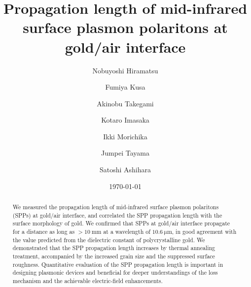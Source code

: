 \documentclass[aip,apl,reprint]{revtex4-1}
\begin{document}
\title{Propagation length of mid-infrared surface plasmon polaritons at gold/air interface}
\author{Nobuyoshi Hiramatsu}
\author{Fumiya Kusa}
\author{Akinobu Takegami}
\author{Kotaro Imasaka}
\author{Ikki Morichika}
\author{Jumpei Tayama}
\author{Satoshi Ashihara}

\date{\today}

\begin{abstract}
We measured the propagation length of mid-infrared surface plasmon polaritons (SPPs) at gold/air interface, and correlated the SPP propagation length with the surface morphology of gold. We confirmed that SPPs at gold/air interface propagate for a distance as long as $>10\:\mathrm{mm}$ at a wavelength of $10.6\:\mathrm{\mu m}$, in good agreement with the value predicted from the dielectric constant of polycrystalline gold. We demonstrated that the SPP propagation length increases by thermal annealing treatment, accompanied by the increased grain size and the suppressed surface roughness. Quantitative evaluation of the SPP propagation length is important in designing plasmonic devices and beneficial for deeper understandings of the loss mechanism and the achievable electric-field enhancements.
\end{abstract}

\maketitle
 
\end{document}
